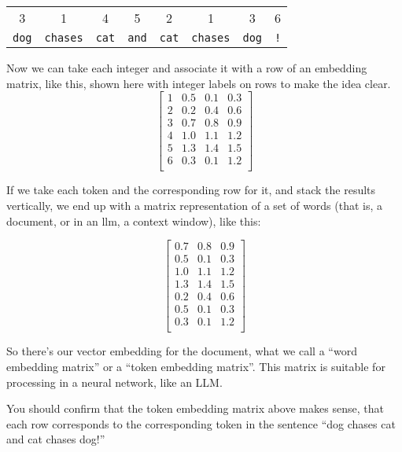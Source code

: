 \begin{center}
\begin{tabular}{c@{}c@{}c@{}c@{}c@{}c@{}c@{}c}
   3 & 1 & 4 & 5 & 2 & 1 & 3 & \hspace{0.5cm}6 \\
   \texttt{dog} & \texttt{\quad chases} & \texttt{\quad cat} & \texttt{\quad and} & \texttt{\quad cat} & \texttt{\quad chases} & \texttt{\quad dog} & \texttt{\quad !} \\
\end{tabular}
\end{center}

Now we can take each integer and associate it with a row of an embedding matrix, like this, shown here with integer labels on rows to make the idea clear.
\[
\left[\begin{array}{c|ccc}
    1 & 0.5 & 0.1 & 0.3 \\
    2 & 0.2 & 0.4 & 0.6 \\
    3 & 0.7 & 0.8 & 0.9 \\
    4 & 1.0 & 1.1 & 1.2 \\
    5 & 1.3 & 1.4 & 1.5 \\
    6 & 0.3 & 0.1 & 1.2 \\
\end{array}\right]
\]

If we take each token and the corresponding row for it, and stack the results vertically, we end up with a matrix representation of a set of words (that is, a document, or in an llm, a context window), like this: 

\[
\begin{bmatrix}
    0.7 & 0.8 & 0.9 \\
    0.5 & 0.1 & 0.3 \\
    1.0 & 1.1 & 1.2 \\
    1.3 & 1.4 & 1.5 \\
    0.2 & 0.4 & 0.6 \\
    0.5 & 0.1 & 0.3 \\
    0.3 & 0.1 & 1.2 \\
\end{bmatrix}
\]

So there's our vector embedding for the document, what we call a ``word embedding matrix'' or a ``token embedding matrix''. This matrix is suitable for processing in a neural network, like an LLM. 

You should confirm that the token embedding matrix above makes sense, that each row corresponds to the corresponding token in the sentence ``dog chases cat and cat chases dog!''